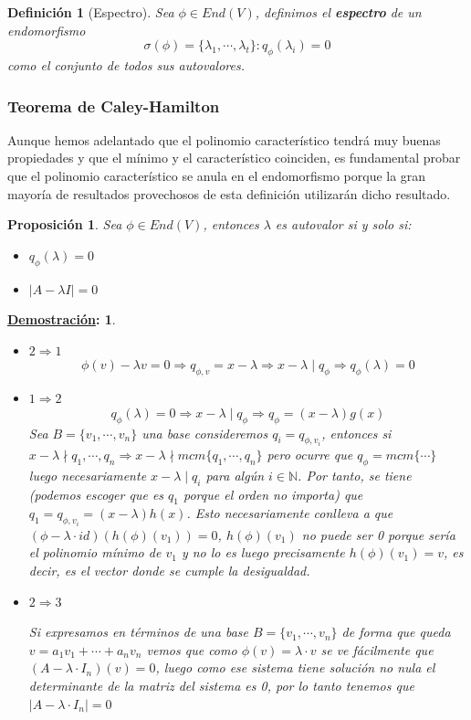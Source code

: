 \documentclass[10pt,a4paper,openright]{book}
\theoremstyle{break}
\newtheorem*{defi}{Definición}
\newtheorem*{prop}{Proposición}
\newtheorem*{demo}{\underline{Demostración}:}
\begin{document}
\begin{defi}[Espectro]
Sea $\phi \in End(V)$, definimos el \textbf{espectro} de un endomorfismo
$$
\sigma(\phi)=\{\lambda_1, \cdots, \lambda_t\}: q_\phi(\lambda_i) = 0
$$
como el conjunto de todos sus autovalores.
\end{defi}

\subsubsection{Teorema de Caley-Hamilton}
Aunque hemos adelantado que el polinomio característico tendrá muy buenas propiedades y que el mínimo y el característico coinciden, es fundamental probar que el polinomio característico se anula en el endomorfismo porque la gran mayoría de resultados provechosos de esta definición utilizarán dicho resultado.

\begin{prop}
Sea $\phi\in End(V)$, entonces $\lambda$ es autovalor si y solo si:
\begin{itemize}
\item $q_\phi(\lambda)=0$
\item $\vert A -\lambda I\vert = 0$
\end{itemize}
\end{prop}
\begin{demo}
\begin{itemize}
\item $2\Rightarrow 1$
$$\phi(v)-\lambda v =0 \Rightarrow q_{\phi,v}=x-\lambda \Rightarrow x-\lambda\mid q_\phi\Rightarrow q_\phi(\lambda)=0$$

\item $1\Rightarrow 2$
$$q_\phi(\lambda)=0\Rightarrow x-\lambda\mid q_\phi\Rightarrow q_\phi = (x-\lambda)g(x)$$
Sea $B=\{v_1, \cdots, v_n\}$ una base consideremos $q_i=q_{\phi,v_i}$, entonces si $x-\lambda \nmid q_1, \cdots, q_n \Rightarrow x-\lambda\nmid mcm\{q_1, \cdots, q_n\}$ pero ocurre que $q_\phi = mcm \{\cdots\}$ luego necesariamente $x-\lambda \mid q_i$ para algún $i \in \mathbb N$. Por tanto, se tiene (podemos escoger que es $q_1$ porque el orden no importa) que $q_1=q_{\phi,v_i} = (x-\lambda)h(x)$. Esto necesariamente conlleva a que $(\phi-\lambda\cdot id)(h(\phi)(v_1))=0$, $h(\phi)(v_1)$ no puede ser 0 porque sería el polinomio mínimo de $v_1$ y no lo es luego precisamente $h(\phi)(v_1)=v$, es decir, es el vector donde se cumple la desigualdad.   

\item $2\Rightarrow 3$

Si expresamos en términos de una base $B=\{v_1,\cdots, v_n\}$ de forma que queda $v=a_1v_1+\cdots+a_nv_n$ vemos que como $\phi(v)=\lambda\cdot v$ se ve fácilmente que $(A-\lambda\cdot I_n)(v)=0$, luego como ese sistema tiene solución no nula el determinante de la matriz del sistema es 0, por lo tanto tenemos que $|A-\lambda \cdot I_n|=0$
\end{itemize}
\end{demo}
\end{document}
